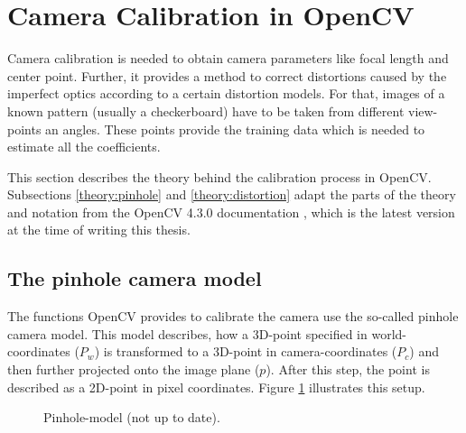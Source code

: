 \section{Camera Calibration in OpenCV\label{theory:calibration}}
Camera calibration is needed to obtain camera parameters like focal length and center point.
Further, it provides a method to correct distortions caused by the imperfect optics according to a certain distortion models.
For that, images of a known pattern (usually a checkerboard) have to be taken from different view-points an angles.
These points provide the training data which is needed to estimate all the coefficients.

This section describes the theory behind the calibration process in OpenCV.
Subsections \ref{theory:pinhole} and \ref{theory:distortion} adapt the parts of the theory and notation from the OpenCV 4.3.0 documentation \cite{cv_calib}, which is the latest version at the time of writing this thesis.

\subsection{The pinhole camera model\label{theory:pinhole}}
The functions OpenCV provides to calibrate the camera use the so-called pinhole camera model.
This model describes, how a 3D-point specified in world-coordinates ($P_w$) is transformed to a 3D-point in camera-coordinates ($P_c$) and then further projected onto the image plane ($p$). After this step, the point is described as a 2D-point in pixel coordinates.  Figure \ref{theory:pin} illustrates this setup.
\begin{figure}[ht]
	\centering
	\caption{Pinhole-model (not up to date).\label{theory:pin}}
\end{figure} 

